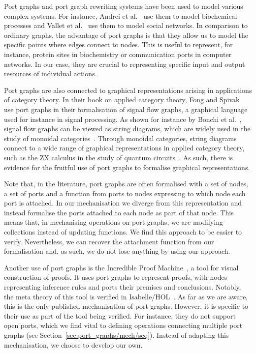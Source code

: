 \documentclass[class=smolathesis,crop=false]{standalone}
\begin{document}
Port graphs and port graph rewriting systems have been used to model various complex systems.
For instance, Andrei et al.~\cite{andrei_et_al-2011} use them to model biochemical processes and Vallet et al.~\cite{vallet_et_al-2015} use them to model social networks.
In comparison to ordinary graphs, the advantage of port graphs is that they allow us to model the specific points where edges connect to nodes.
This is useful to represent, for instance, protein sites in biochemistry or communication ports in computer networks.
In our case, they are crucial to representing specific input and output resources of individual actions.

Port graphs are also connected to graphical representations arising in applications of category theory.
In their book on applied category theory, Fong and Spivak~\cite{fong_spivak-2019} use port graphs in their formalisation of signal flow graphs, a graphical language used for instance in signal processing.
As shown for instance by Bonchi et al.~\cite{bonchi_et_al-2015}, signal flow graphs can be viewed as string diagrams, which are widely used in the study of monoidal categories~\cite{maclane-1998}.
Through monoidal categories, string diagrams connect to a wide range of graphical representations in applied category theory, such as the ZX calculus in the study of quantum circuits~\cite{coecke_duncan-2008,kissinger_zamdzhiev-2015}.
As such, there is evidence for the fruitful use of port graphs to formalise graphical representations.

Note that, in the literature, port graphs are often formalised with a set of nodes, a set of ports and a function from ports to nodes expressing to which node each port is attached.
In our mechanisation we diverge from this representation and instead formalise the ports attached to each node as part of that node.
This means that, in mechanising operations on port graphs, we are modifying collections instead of updating functions.
We find this approach to be easier to verify.
Nevertheless, we can recover the attachment function from our formalisation and, as such, we do not lose anything by using our approach.

Another use of port graphs is the Incredible Proof Machine~\cite{breitner_2016}, a tool for visual construction of proofs.
It uses port graphs to represent proofs, with nodes representing inference rules and ports their premises and conclusions.
Notably, the meta theory of this tool is verified in Isabelle/HOL~\cite{Incredible_Proof_Machine-AFP}.
As far as we are aware, this is the only published mechanisation of port graphs.
However, it is specific to their use as part of the tool being verified.
For instance, they do not support open ports, which we find vital to defining operations connecting multiple port graphs (see Section~\ref{sec:port_graphs/mech/seq}).
Instead of adapting this mechanisation, we choose to develop our own.
\end{document}

